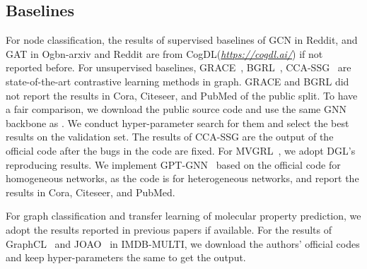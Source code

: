 \subsection{Baselines}
For node classification, the results of supervised baselines of GCN in Reddit, and GAT in Ogbn-arxiv and Reddit are from CogDL(\textit{\url{https://cogdl.ai/}}) if not reported before. For unsupervised baselines, GRACE~\cite{zhu2020deep}, BGRL~\cite{thakoor2021bootstrapped}, CCA-SSG~\cite{zhang2021canonical} are state-of-the-art contrastive learning methods in graph. 
GRACE and BGRL did not report the results in Cora, Citeseer, and PubMed of the public split. To have a fair comparison, we download the public source code and use the same GNN backbone as \model. We conduct hyper-parameter search for them and select the best results on the validation set.
The results of CCA-SSG are the output of the official code after the bugs in the code are fixed. For MVGRL~\cite{hassani2020contrastive}, we adopt DGL's reproducing results. We implement GPT-GNN~\cite{hu2020gpt} based on the official code for homogeneous networks, as the code is for heterogeneous networks, and report the results in Cora, Citeseer, and PubMed. 

For graph classification and transfer learning of molecular property prediction, we adopt the results reported in previous papers if available. For the results of GraphCL~\cite{you2020graph} and JOAO~\cite{you2021graph} in IMDB-MULTI, we download the authors' official codes and keep hyper-parameters the same to get the output. 

